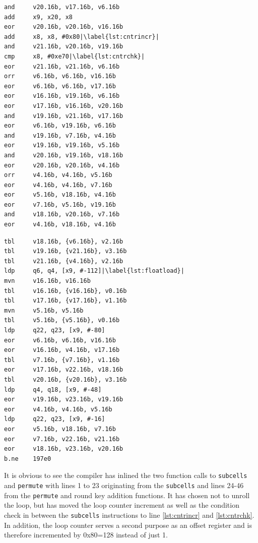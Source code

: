 \begin{minipage}{.45\textwidth}
    \begin{lstlisting}[language={[ARM]Assembler}, caption={Round function asm}, escapechar=|]
and     v20.16b, v17.16b, v6.16b
add     x9, x20, x8
eor     v20.16b, v20.16b, v16.16b
add     x8, x8, #0x80|\label{lst:cntrincr}|
and     v21.16b, v20.16b, v19.16b
cmp     x8, #0xe70|\label{lst:cntrchk}|
eor     v21.16b, v21.16b, v6.16b
orr     v6.16b, v6.16b, v16.16b
eor     v6.16b, v6.16b, v17.16b
eor     v16.16b, v19.16b, v6.16b
eor     v17.16b, v16.16b, v20.16b
and     v19.16b, v21.16b, v17.16b
eor     v6.16b, v19.16b, v6.16b
and     v19.16b, v7.16b, v4.16b
eor     v19.16b, v19.16b, v5.16b
and     v20.16b, v19.16b, v18.16b
eor     v20.16b, v20.16b, v4.16b
orr     v4.16b, v4.16b, v5.16b
eor     v4.16b, v4.16b, v7.16b
eor     v5.16b, v18.16b, v4.16b
eor     v7.16b, v5.16b, v19.16b
and     v18.16b, v20.16b, v7.16b
eor     v4.16b, v18.16b, v4.16b
    \end{lstlisting}
\end{minipage}\hfill
\begin{minipage}{.45\textwidth}
    \vspace*{7mm}
    \begin{lstlisting}[language={[ARM]Assembler}, firstnumber=24, escapechar=|]
tbl     v18.16b, {v6.16b}, v2.16b
tbl     v19.16b, {v21.16b}, v3.16b
tbl     v21.16b, {v4.16b}, v2.16b
ldp     q6, q4, [x9, #-112]|\label{lst:floatload}|
mvn     v16.16b, v16.16b
tbl     v16.16b, {v16.16b}, v0.16b
tbl     v17.16b, {v17.16b}, v1.16b
mvn     v5.16b, v5.16b
tbl     v5.16b, {v5.16b}, v0.16b
ldp     q22, q23, [x9, #-80]
eor     v6.16b, v6.16b, v16.16b
eor     v16.16b, v4.16b, v17.16b
tbl     v7.16b, {v7.16b}, v1.16b
eor     v17.16b, v22.16b, v18.16b
tbl     v20.16b, {v20.16b}, v3.16b
ldp     q4, q18, [x9, #-48]
eor     v19.16b, v23.16b, v19.16b
eor     v4.16b, v4.16b, v5.16b
ldp     q22, q23, [x9, #-16]
eor     v5.16b, v18.16b, v7.16b
eor     v7.16b, v22.16b, v21.16b
eor     v18.16b, v23.16b, v20.16b
b.ne    197e0
    \end{lstlisting}
\end{minipage}

It is obvious to see the compiler has inlined the two function calls to
\texttt{subcells} and \texttt{permute} with lines 1 to 23 originating from the
\texttt{subcells} and lines 24-46 from the \texttt{permute} and round key
addition functions. It has chosen not to unroll the loop, but has moved the
loop counter increment as well as the condition check in between the
\texttt{subcells} instructions to line \ref{lst:cntrincr} and
\ref{lst:cntrchk}. In addition, the loop counter serves a second purpose as an
offset register and is therefore incremented by 0x80=128 instead of just 1.


